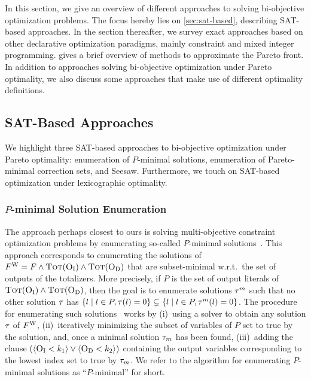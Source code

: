 In this section, we give an overview of different approaches to solving bi-objective optimization problems.
The focus hereby lies on \cref{sec:sat-based}, describing SAT-based approaches.
In the section thereafter, we survey exact approaches based on other declarative optimization paradigms, mainly constraint and mixed integer programming.
 gives a brief overview of methods to approximate the Pareto front.
In addition to approaches solving bi-objective optimization under Pareto optimality, we also discuss some approaches that make use of different optimality definitions.

\subsection{SAT-Based Approaches\label{sec:sat-based}}

We highlight three SAT-based approaches to bi-objective optimization under Pareto optimality:
enumeration of $P$-minimal solutions, enumeration of Pareto-minimal correction sets, and Seesaw.
Furthermore, we touch on SAT-based optimization under lexicographic optimality.

\subsubsection{$P$-minimal Solution Enumeration\label{sec:p-minimal}}

The approach perhaps closest to ours is solving multi-objective constraint optimization problems by enumerating so-called $P$-minimal solutions~\autocites{DBLP:conf/cp/SohBTB17,DBLP:conf/ftp/KoshimuraNFH09}.
This approach corresponds to enumerating the solutions of $F^\text{W} = F \land \textsc{Tot}(\textsc{O}_{\text{I}}) \land \textsc{Tot}(\textsc{O}_{\text{D}})$ that are subset-minimal w.r.t.\ the set of outputs of the totalizers.
More precisely, if $P$ is the set of output literals of $\textsc{Tot}(\textsc{O}_{\text{I}}) \land \textsc{Tot}(\textsc{O}_{\text{D}})$, then the goal is to enumerate solutions $\tau^m$ such that no other solution $\tau$ has $\{ l \mid l \in P, \tau(l) = 0\} \subsetneq \{ l \mid l \in P, \tau^m(l) = 0\}$.
The procedure for enumerating such solutions~\autocite{DBLP:conf/ftp/KoshimuraNFH09} works by (i)~using a solver to obtain any solution $\tau$ of $F^\text{W}$, (ii)~iteratively minimizing the subset of variables of $P$ set to true by the solution, and, once a minimal solution $\tau_m$ has been found, (iii)~adding the clause $(\langle \textsc{O}_{\text{I}} < k_1 \rangle \lor \langle \textsc{O}_{\text{D}} < k_2 \rangle)$ containing the output variables corresponding to the lowest index set to true by $\tau_m$.
We refer to the algorithm for enumerating $P$-minimal solutions as ``$P$-minimal'' for short.

